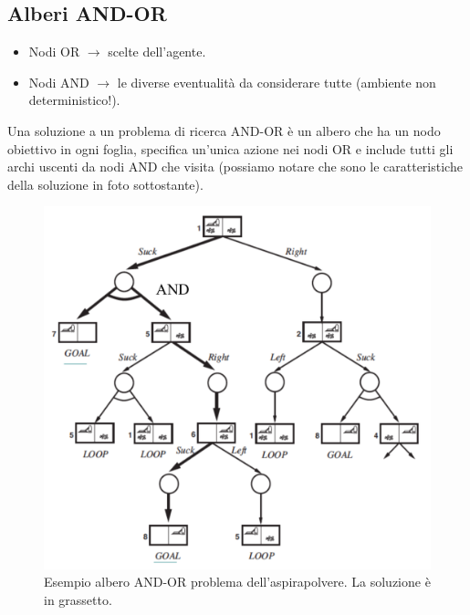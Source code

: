 \documentclass{article}
\begin{document}
\subsection{Alberi AND-OR}
\begin{itemize}
    \item Nodi OR $\rightarrow$ scelte dell'agente.
    \item Nodi AND $\rightarrow$ le diverse eventualità da considerare tutte (ambiente non deterministico!).
\end{itemize}
Una soluzione a un problema di ricerca AND-OR è un albero che ha un nodo obiettivo in ogni foglia, specifica un'unica azione nei nodi OR e include tutti gli archi uscenti da nodi AND che visita (possiamo notare che sono le caratteristiche della soluzione in foto sottostante).
\clearpage
\begin{figure}[H]
    \centering
    \includegraphics[scale=0.5]{Images/andortree.png}
    \caption{Esempio albero AND-OR problema dell'aspirapolvere. La soluzione è in grassetto.}
\end{figure}
\end{document}
